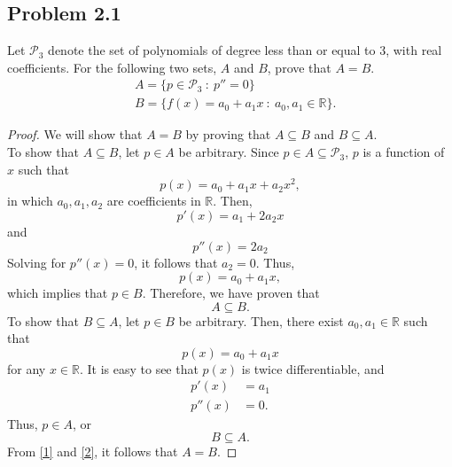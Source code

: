 \subsection*{Problem 2.1}
Let $\mathcal{P}_3$ denote the set of polynomials of degree less than or equal to 3, with real coefficients. For the following two sets, $A$ and $B$, prove that $A=B$.
	\begin{align*}
		&A = \{ p\in\mathcal{P}_3\ :\ p''=0    \}\\
		&B = \{ f(x)=a_0 + a_1 x\ :\ a_0,a_1\in\mathbb{R}    \}.
	\end{align*}
\renewcommand\qedsymbol{$\blacksquare$}
\begin{proof}
We will show that $A=B$ by proving that $A\subseteq B$ and $B\subseteq A$.\\
To show that $A\subseteq B$, let $p\in A$ be arbitrary. Since $p\in A\subseteq\mathcal{P}_3$, $p$ is a function of $x$ such that
\begin{equation*}
    p(x) = a_0 + a_1x + a_2x^2,
\end{equation*}
in which $a_0, a_1, a_2$ are coefficients in $\mathbb{R}$. Then,
\begin{equation*}
    p'(x) = a_1 + 2a_2x
\end{equation*}
and
\begin{equation*}
    p''(x) = 2a_2
\end{equation*}
Solving for $p''(x) = 0$, it follows that $a_2 = 0$. Thus,
\begin{equation*}
    p(x) = a_0 + a_1x,
\end{equation*}
which implies that $p\in B$. Therefore, we have proven that 
\[
A\subseteq B\tag{1}\label{1}.
\]
To show that $B\subseteq A$, let $p\in B$ be arbitrary. Then, there exist $a_0, a_1\in \mathbb{R}$ such that
\begin{equation*}
    p(x) = a_0 + a_1x
\end{equation*}
for any $x\in \mathbb{R}$. It is easy to see that $p(x)$ is twice differentiable, and
\begin{equation*}
\begin{aligned}
    p'(x)  &= a_1\\
    p''(x) &= 0.
\end{aligned}
\end{equation*}
Thus, $p\in A$, or
\[
B\subseteq A\tag{2}\label{2}.
\]
From \eqref{1} and \eqref{2}, it follows that $A = B$.
\end{proof}